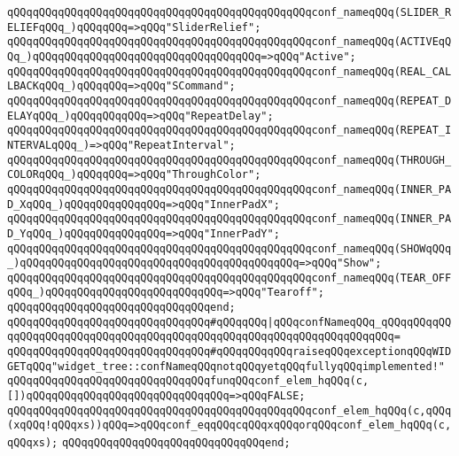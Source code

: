\verb|qQQqqQQqqQQqqQQqqQQqqQQqqQQqqQQqqQQqqQQqqQQqqQQqconf_nameqQQq(SLIDER_RELIEFqQQq_)qQQqqQQq=>qQQq"SliderRelief";|\newline
\verb|qQQqqQQqqQQqqQQqqQQqqQQqqQQqqQQqqQQqqQQqqQQqqQQqconf_nameqQQq(ACTIVEqQQq_)qQQqqQQqqQQqqQQqqQQqqQQqqQQqqQQqqQQq=>qQQq"Active";|\newline
\verb|qQQqqQQqqQQqqQQqqQQqqQQqqQQqqQQqqQQqqQQqqQQqqQQqconf_nameqQQq(REAL_CALLBACKqQQq_)qQQqqQQq=>qQQq"SCommand";|\newline
\verb|qQQqqQQqqQQqqQQqqQQqqQQqqQQqqQQqqQQqqQQqqQQqqQQqconf_nameqQQq(REPEAT_DELAYqQQq_)qQQqqQQqqQQq=>qQQq"RepeatDelay";|\newline
\verb|qQQqqQQqqQQqqQQqqQQqqQQqqQQqqQQqqQQqqQQqqQQqqQQqconf_nameqQQq(REPEAT_INTERVALqQQq_)=>qQQq"RepeatInterval";|\newline
\verb|qQQqqQQqqQQqqQQqqQQqqQQqqQQqqQQqqQQqqQQqqQQqqQQqconf_nameqQQq(THROUGH_COLORqQQq_)qQQqqQQq=>qQQq"ThroughColor";|\newline
\verb|qQQqqQQqqQQqqQQqqQQqqQQqqQQqqQQqqQQqqQQqqQQqqQQqconf_nameqQQq(INNER_PAD_XqQQq_)qQQqqQQqqQQqqQQq=>qQQq"InnerPadX";|\newline
\verb|qQQqqQQqqQQqqQQqqQQqqQQqqQQqqQQqqQQqqQQqqQQqqQQqconf_nameqQQq(INNER_PAD_YqQQq_)qQQqqQQqqQQqqQQq=>qQQq"InnerPadY";|\newline
\verb|qQQqqQQqqQQqqQQqqQQqqQQqqQQqqQQqqQQqqQQqqQQqqQQqconf_nameqQQq(SHOWqQQq_)qQQqqQQqqQQqqQQqqQQqqQQqqQQqqQQqqQQqqQQqqQQq=>qQQq"Show";|\newline
\verb|qQQqqQQqqQQqqQQqqQQqqQQqqQQqqQQqqQQqqQQqqQQqqQQqconf_nameqQQq(TEAR_OFFqQQq_)qQQqqQQqqQQqqQQqqQQqqQQqqQQq=>qQQq"Tearoff";|\newline
\verb|qQQqqQQqqQQqqQQqqQQqqQQqqQQqqQQqend;|\newline
\verb|qQQqqQQqqQQqqQQqqQQqqQQqqQQqqQQq#qQQqqQQq|\verb#|qQQqconfNameqQQq_qQQqqQQqqQQqqQQqqQQqqQQqqQQqqQQqqQQqqQQqqQQqqQQqqQQqqQQqqQQqqQQqqQQqqQQq=#\newline
\verb|qQQqqQQqqQQqqQQqqQQqqQQqqQQqqQQq#qQQqqQQqqQQqraiseqQQqexceptionqQQqWIDGETqQQq"widget_tree::confNameqQQqnotqQQqyetqQQqfullyqQQqimplemented!"|\newline
\newline
\verb|qQQqqQQqqQQqqQQqqQQqqQQqqQQqqQQqfunqQQqconf_elem_hqQQq(c,[])qQQqqQQqqQQqqQQqqQQqqQQqqQQqqQQq=>qQQqFALSE;|\newline
\verb|qQQqqQQqqQQqqQQqqQQqqQQqqQQqqQQqqQQqqQQqqQQqqQQqconf_elem_hqQQq(c,qQQq(xqQQq!qQQqxs))qQQq=>qQQqconf_eqqQQqcqQQqxqQQqorqQQqconf_elem_hqQQq(c,qQQqxs);|\newline
\verb|qQQqqQQqqQQqqQQqqQQqqQQqqQQqqQQqend;|\newline
